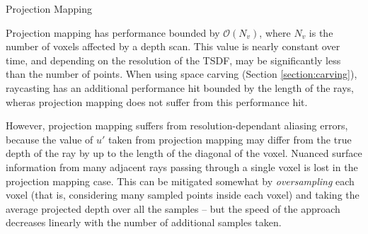 \documentclass[10pt,twocolumn,letterpaper]{article}
\begin{document}
\begin{algorithm} 
	\caption{Projection Mapping}
	\label{alg:projection_mapping}
	\begin{algorithmic}[1]
		    	\label{alg:line:voxel_carve}
			\EndIf
	    \EndIf
			\label{alg:line:tsdf_update}
		\EndIf
	\EndFor
	\end{algorithmic}
\end{algorithm}


Projection mapping has performance bounded by $\mathcal{O}(N_v)$, where $N_v$ is
the number of voxels affected by a depth scan. This value is nearly constant
over time, and depending on the resolution of the TSDF, may be significantly
less than the number of points. When using space carving (Section
\ref{section:carving}), raycasting has an additional performance hit bounded by
the length of the rays, wheras projection mapping does not suffer from this
performance hit. 

However, projection mapping suffers from resolution-dependant aliasing errors,
because the value of $u'$ taken from projection mapping may differ from the true
depth of the ray by up to the length of the diagonal of the voxel. Nuanced
surface information from many adjacent rays passing through a single voxel is
lost in the projection mapping case. This can be mitigated somewhat by
\textit{oversampling} each voxel (that is, considering many sampled points
inside each voxel) and taking the average projected depth over all the samples
-- but the speed of the approach decreases linearly with the number of 
additional samples taken. 
\end{document}
